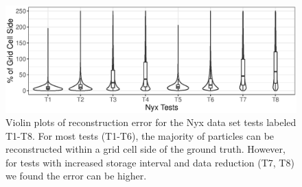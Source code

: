 \begin{figure}[!t]
\centering
\includegraphics[width=\linewidth]{Images/Nyx_Tests.eps}
\caption{{Violin plots of reconstruction error for the Nyx data set tests labeled T1-T8. For most tests (T1-T6), the majority of particles can be reconstructed within a grid cell side of the ground truth. However, for tests with increased storage interval and data reduction (T7, T8) we found the error can be higher.}}
\vspace{-2mm}
\label{fig:nyx_plot}
\end{figure}
